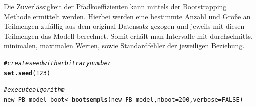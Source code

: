 \documentclass{article}\usepackage[]{graphicx}\usepackage[]{color}
\makeatletter
\newcommand{\hlnum}[1]{\textcolor[rgb]{0.686,0.059,0.569}{#1}}%
\newcommand{\hlcom}[1]{\textcolor[rgb]{0.678,0.584,0.686}{\textit{#1}}}%
\newcommand{\hlstd}[1]{\textcolor[rgb]{0.345,0.345,0.345}{#1}}%
\newcommand{\hlkwb}[1]{\textcolor[rgb]{0.69,0.353,0.396}{#1}}%
\newcommand{\hlkwc}[1]{\textcolor[rgb]{0.333,0.667,0.333}{#1}}%
\newcommand{\hlkwd}[1]{\textcolor[rgb]{0.737,0.353,0.396}{\textbf{#1}}}%
\newenvironment{kframe}{%
 \def\at@end@of@kframe{}%
 \ifinner\ifhmode%
  \def\at@end@of@kframe{\end{minipage}}%
  \begin{minipage}{\columnwidth}%
 \fi\fi%
 \def\FrameCommand##1{\hskip\@totalleftmargin \hskip-\fboxsep
 \colorbox{shadecolor}{##1}\hskip-\fboxsep
     \hskip-\linewidth \hskip-\@totalleftmargin \hskip\columnwidth}%
 \MakeFramed {\advance\hsize-\width
   \@totalleftmargin\z@ \linewidth\hsize
   \@setminipage}}%
 {\par\unskip\endMakeFramed%
 \at@end@of@kframe}
\newenvironment{knitrout}{}{} %
\makeatother
\begin{document}
Die Zuverlässigkeit der Pfadkoeffizienten kann mittels der Bootstrapping Methode ermittelt werden. Hierbei werden eine bestimmte Anzahl und Größe an Teilmengen zufällig aus dem original Datensatz gezogen und jeweils mit diesen Teilmengen das Modell berechnet. Somit erhält man Intervalle mit durchschnitts, minimalen, maximalen Werten, sowie Standardfehler der jeweiligen Beziehung.

\begin{knitrout}
\color{fgcolor}\begin{kframe}
\begin{alltt}
\hlcom{#create seed with arbitrary number}
\hlkwd{set.seed}\hlstd{(}\hlnum{123}\hlstd{)}

\hlcom{#execute algorithm}
\hlstd{new_PB_model_boot} \hlkwb{<-} \hlkwd{bootsempls}\hlstd{(new_PB_model,} \hlkwc{nboot}\hlstd{=}\hlnum{200}\hlstd{,} \hlkwc{verbose}\hlstd{=}\hlnum{FALSE}\hlstd{)}


\end{alltt}
\end{kframe}
\end{knitrout}
\end{document}
